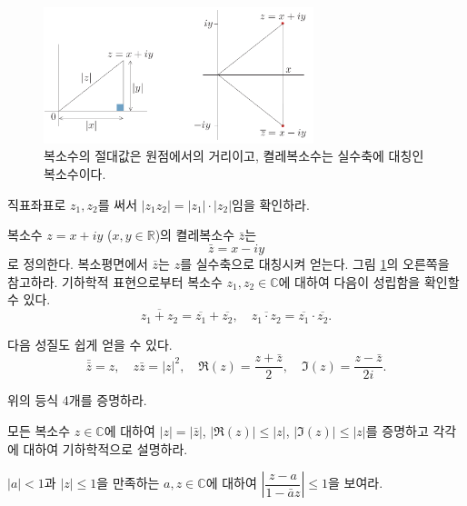 \begin{figure}[!h]
\begin{center}
\includegraphics[width=0.7\textwidth]{./SaltChapter/figs/fig-1-9}
\end{center}
\caption{복소수의 절대값은 원점에서의 거리이고, 켤레복소수는 실수축에 대칭인 복소수이다.}
\label{fig-1-9}
\end{figure}

\begin{salt_exercise} \label{ex-1-14}
직표좌표로 $z_1, z_2$를 써서 $|z_1z_2| = |z_1|\cdot |z_2|$임을 확인하라.
\end{salt_exercise}

복소수 $z=x+iy$ ($x,y\in\mathbb R$)의 켤레복소수 $\bar z$는
$$
\bar z = x - iy
$$
로 정의한다.
복소평면에서 $\bar z$는 $z$를 실수축으로 대칭시켜 얻는다.
그림 \ref{fig-1-9}의 오른쪽을 참고하라.
기하학적 표현으로부터 복소수 $z_1, z_2\in\mathbb C$에 대하여
다음이 성립함을 확인할 수 있다.
$$
\overline{z_1+z_2} = \overline{z_1} + \overline{z_2},
\quad
\overline{z_1\cdot z_2} = \overline{z_1} \cdot \overline{z_2}.
$$

다음 성질도 쉽게 얻을 수 있다.
$$
\bar{\bar z} = z, \quad z\bar z  = |z|^2, \quad
\Re(z) = \frac{z+\bar z}2, \quad \Im(z) = \frac{z-\bar z}{2i}.
$$

\begin{salt_exercise} \label{ex-1-15}
위의 등식 4개를 증명하라.
\end{salt_exercise}

\begin{salt_exercise} \label{ex-1-16}
모든 복소수 $z\in\mathbb C$에 대하여
$|z|=|\bar z|$, $|\Re(z)|\le |z|$, $|\Im(z)| \le |z|$를 증명하고
각각에 대하여 기하학적으로 설명하라.
\end{salt_exercise}

\begin{salt_exercise} \label{ex-1-17}
$|a|<1$과 $|z|\le 1$을 만족하는 $a,z\in\mathbb C$에 대하여
$\left| \dfrac{z-a}{1-\bar a z}\right| \le 1$을 보여라.
\end{salt_exercise}

